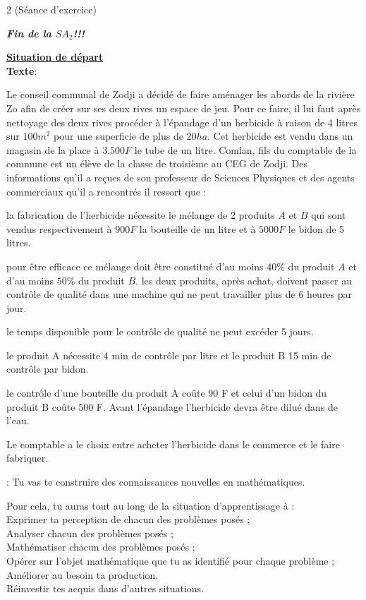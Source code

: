 \begin{multicols*}{2}
  	(Séance d'exercice)
  	\begin{center}
  		\it\textit{\textbf{Fin de la $SA_{2} $!!!}}
  	\end{center}
  	\underline{\textbf{Situation de départ}} \\
  	\textbf{Texte}:	
  	
  	Le conseil communal de Zodji a décidé de faire aménager les abords de la rivière Zo afin de créer sur ses deux rives un espace de jeu. Pour ce faire, il lui faut après nettoyage des deux rives procéder à l’épandage d’un herbicide à raison de 4 litres sur $100 m^2$ pour une superficie de plus de $20 ha$. Cet herbicide est vendu dans un magasin de la place à $3.500 F$ le tube de un litre. Comlan, fils du comptable de la commune est un élève de la classe de troisième au CEG de Zodji. Des informations qu’il a reçues de son professeur de Sciences Physiques et des agents commerciaux qu’il a rencontrés il ressort que :
  	
  	 la fabrication de l’herbicide nécessite le mélange de 2 produits $A$ et $B$ qui sont vendus respectivement à $900F$ la bouteille de un litre et à $5000 F$ le bidon de 5 litres.
  	
  	 pour être efficace ce mélange doit être constitué d’au moins $40\%$ du produit $A$ et d’au moins $50 \%$ du produit $B$. les deux produits, après achat, doivent passer au contrôle de qualité dans une machine qui ne peut travailler plus de 6 heures par jour.
  	
  	 le temps disponible pour le contrôle de qualité ne peut excéder 5 jours. 
  	
  	 le produit A nécessite 4 min de contrôle par litre et le produit B 15 min de contrôle par bidon.
  	
  	 le contrôle d’une bouteille du produit A coûte 90 F et celui d’un bidon du produit B coûte 500 F. 
  	Avant l’épandage l’herbicide devra être dilué dans de l’eau. 
  	
  	Le comptable a le choix entre acheter l’herbicide dans le commerce et le faire fabriquer.
  	
  	 : Tu vas te construire des connaissances nouvelles en mathématiques.
  	
  	Pour cela, tu auras tout au long de la situation d’apprentissage à :\\ 
  	 Exprimer ta perception de chacun des problèmes posés ;\\ 
  	 Analyser chacun des problèmes posés ; \\
  	 Mathématiser chacun des problèmes posés ; \\
  	 Opérer sur l’objet mathématique que tu as identifié pour chaque problème ; \\
  	 Améliorer au besoin ta production.\\
  	 Réinvestir tes acquis dans d’autres situations.
  	

\end{multicols*}
